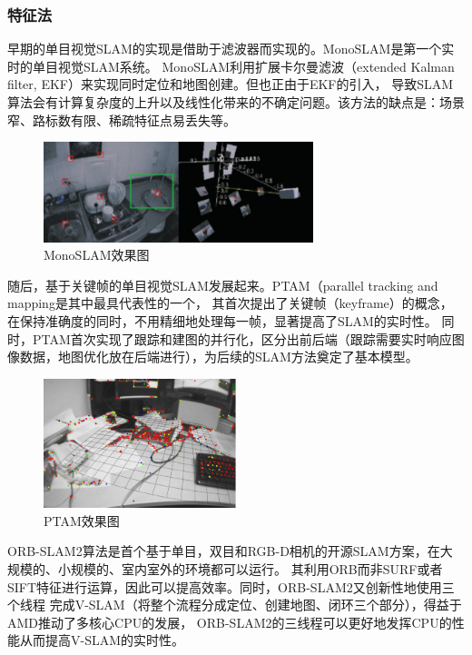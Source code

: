 \documentclass[cs4size,a4paper]{ctexart}
\numberwithin{equation}{section}
\numberwithin{table}{section}
\numberwithin{figure}{section}
\begin{document}
\subsubsection{特征法}
早期的单目视觉SLAM的实现是借助于滤波器而实现的\cite{9781921987243,0000001}。MonoSLAM\cite{9781921987243}是第一个实时的单目视觉SLAM系统。
MonoSLAM利用扩展卡尔曼滤波（extended Kalman filter, EKF）来实现同时定位和地图创建。但也正由于EKF的引入，
导致SLAM算法会有计算复杂度的上升以及线性化带来的不确定问题。该方法的缺点是：场景窄、路标数有限、稀疏特征点易丢失等。
\begin{figure}[H]
        \centering
        \includegraphics[width=0.7\textwidth]{figure/monoslam.png}
        \caption{MonoSLAM效果图}
\end{figure}

随后，基于关键帧的单目视觉SLAM发展起来。PTAM（parallel tracking and mapping\cite{0000002}是其中最具代表性的一个，
其首次提出了关键帧（keyframe）的概念，在保持准确度的同时，不用精细地处理每一帧，显著提高了SLAM的实时性。
同时，PTAM首次实现了跟踪和建图的并行化，区分出前后端（跟踪需要实时响应图像数据，地图优化放在后端进行），为后续的SLAM方法奠定了基本模型。
\begin{figure}[H]
        \centering
        \includegraphics[width=0.5\textwidth]{figure/ptam.png}
        \caption{PTAM效果图}
\end{figure}


ORB-SLAM2算法\cite{murAcceptedTRO2015,murORB2}是首个基于单目，双目和RGB-D相机的开源SLAM方案，在大规模的、小规模的、室内室外的环境都可以运行。
其利用ORB而非SURF\cite{SURF}或者SIFT\cite{sift}特征进行运算，因此可以提高效率。同时，ORB-SLAM2又创新性地使用三个线程
完成V-SLAM（将整个流程分成定位、创建地图、闭环三个部分），得益于AMD推动了多核心CPU的发展\cite{wiki:Multi-core_processor,core_0001,core_0002}，
ORB-SLAM2的三线程可以更好地发挥CPU的性能从而提高V-SLAM的实时性。
\end{document}
